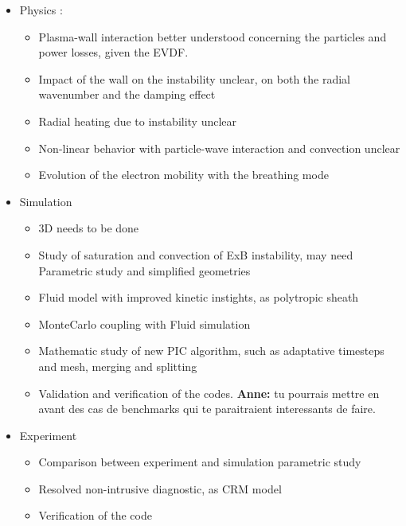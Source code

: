 \begin{itemize}
  \item Physics :
  \begin{itemize}
    \item Plasma-wall interaction better understood concerning the particles and power losses, given the EVDF. 
    \item Impact of the wall on the instability unclear, on both the radial wavenumber and the damping effect
    \item Radial heating due to instability unclear
    \item Non-linear behavior with particle-wave interaction and convection unclear
    \item Evolution of the electron mobility with the breathing mode
  \end{itemize}
  \item Simulation
  \begin{itemize}
    \item 3D needs to be done
    \item Study of saturation and convection of ExB instability, may need Parametric study and simplified geometries
    \item Fluid model with improved kinetic instights, as polytropic sheath
    \item MonteCarlo coupling with Fluid simulation
    \item Mathematic study of new PIC algorithm, such as adaptative timesteps and mesh, merging and splitting
    \item Validation and verification of the codes. {\bf Anne: } tu pourrais mettre en avant des cas de benchmarks qui te paraitraient interessants de faire.
  \end{itemize}
  \item Experiment
  \begin{itemize}
    \item Comparison between experiment and simulation parametric study
    \item Resolved non-intrusive diagnostic, as CRM model
    \item Verification of the code
  \end{itemize}
  
  
\end{itemize}



